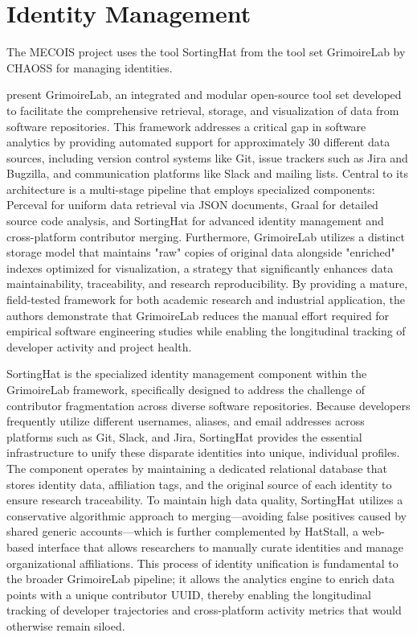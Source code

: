 \section{Identity Management}
\label{sec:identity_management}

The MECOIS project uses the tool SortingHat from the tool set GrimoireLab by CHAOSS for managing identities.

\textcite{duenas2021grimoirelab} present GrimoireLab, an integrated and modular open-source tool set developed to facilitate the comprehensive retrieval, storage, and visualization of data from software repositories. This framework addresses a critical gap in software analytics by providing automated support for approximately 30 different data sources, including version control systems like Git, issue trackers such as Jira and Bugzilla, and communication platforms like Slack and mailing lists. Central to its architecture is a multi-stage pipeline that employs specialized components: Perceval for uniform data retrieval via \ac{JSON} documents, Graal for detailed source code analysis, and SortingHat for advanced identity management and cross-platform contributor merging. Furthermore, GrimoireLab utilizes a distinct storage model that maintains "raw" copies of original data alongside "enriched" indexes optimized for visualization, a strategy that significantly enhances data maintainability, traceability, and research reproducibility. By providing a mature, field-tested framework for both academic research and industrial application, the authors demonstrate that GrimoireLab reduces the manual effort required for empirical software engineering studies while enabling the longitudinal tracking of developer activity and project health.

SortingHat is the specialized identity management component within the GrimoireLab framework, specifically designed to address the challenge of contributor fragmentation across diverse software repositories. Because developers frequently utilize different usernames, aliases, and email addresses across platforms such as Git, Slack, and Jira, SortingHat provides the essential infrastructure to unify these disparate identities into unique, individual profiles. The component operates by maintaining a dedicated relational database that stores identity data, affiliation tags, and the original source of each identity to ensure research traceability. To maintain high data quality, SortingHat utilizes a conservative algorithmic approach to merging—avoiding false positives caused by shared generic accounts—which is further complemented by HatStall, a web-based interface that allows researchers to manually curate identities and manage organizational affiliations. This process of identity unification is fundamental to the broader GrimoireLab pipeline; it allows the analytics engine to enrich data points with a unique contributor \ac{UUID}, thereby enabling the longitudinal tracking of developer trajectories and cross-platform activity metrics that would otherwise remain siloed. \autocite{duenas2021grimoirelab}
